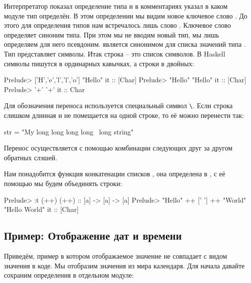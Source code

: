 Интерпретатор показал определение типа и в комментариях 
указал в каком модуле тип определён. В этом определении мы
видим новое ключевое слово  . До этого для определения
типов нам встречалось лишь слово . 
Ключевое слово  определяет синоним типа. При этом
мы не вводим новый тип, мы лишь определяем для него псевдоним. 
 является синонимом для списка значений типа 
. Тип
 представляет символы. Итак строка -- это список символов.
В Haskell символы пишутся в ординарных кавычках, а строки
в двойных:


\begin{code}
Prelude> ['H','e','l','l','o']
"Hello"
it :: [Char]
Prelude> "Hello"
"Hello"
it :: [Char]
Prelude> '+'
'+'
it :: Char
\end{code}

Для обозначения переноса используется специальный символ 
\verb!\!.
Если строка слишком длинная и не помещается на одной строке,
то её можно перенести так:

\begin{code}
str = "My long long long long \
        \long long string"
\end{code}

Перенос осуществляется с помощью комбинации следующих
друг за другом обратных слэшей. 

Нам понадобится функция конкатенации списков \In{(++)},
она определена в , с её помощью мы будем объединять строки:

\begin{code}
Prelude> :t (++)
(++) :: [a] -> [a] -> [a]
Prelude> "Hello" ++ [' '] ++ "World"
"Hello World"
it :: [Char]
\end{code}


\subsection{Пример: Отображение дат и времени}

Приведём, пример в котором отображаемое значение не совпадает
с видом значения в коде. Мы отобразим значения из мира календаря.
Для начала давайте сохраним определения в отдельном модуле:

